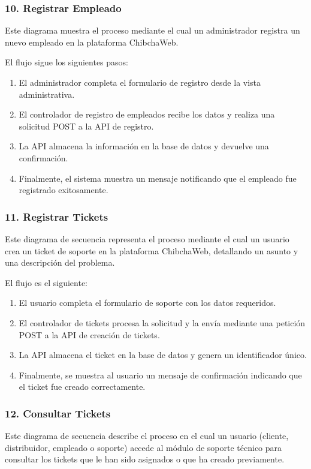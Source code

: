 \subsubsection*{10. Registrar Empleado}

 Este diagrama muestra el proceso mediante el cual un administrador registra un nuevo empleado en la plataforma ChibchaWeb.

El flujo sigue los siguientes pasos:

\begin{enumerate}
    \item El administrador completa el formulario de registro desde la vista administrativa.
    \item El controlador de registro de empleados recibe los datos y realiza una solicitud POST a la API de registro.
    \item La API almacena la información en la base de datos y devuelve una confirmación.
    \item Finalmente, el sistema muestra un mensaje notificando que el empleado fue registrado exitosamente.
\end{enumerate}

\subsubsection*{11. Registrar Tickets}

Este diagrama de secuencia representa el proceso mediante el cual un usuario crea un ticket de soporte en la plataforma ChibchaWeb, detallando un asunto y una descripción del problema.

El flujo es el siguiente:

\begin{enumerate}
    \item El usuario completa el formulario de soporte con los datos requeridos.
    \item El controlador de tickets procesa la solicitud y la envía mediante una petición POST a la API de creación de tickets.
    \item La API almacena el ticket en la base de datos y genera un identificador único.
    \item Finalmente, se muestra al usuario un mensaje de confirmación indicando que el ticket fue creado correctamente.
\end{enumerate}

\subsubsection*{12. Consultar Tickets}
Este diagrama de secuencia describe el proceso en el cual un usuario (cliente, distribuidor, empleado o soporte) accede al módulo de soporte técnico para consultar los tickets que le han sido asignados o que ha creado previamente.

